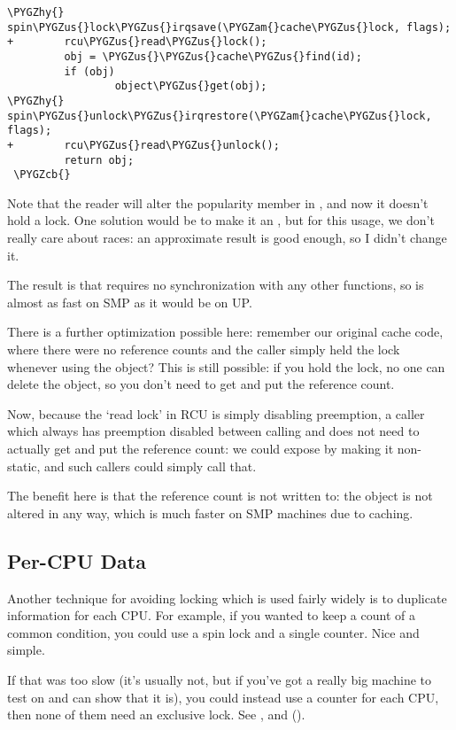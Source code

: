 \documentclass[a4paper,8pt,english]{sphinxmanual}
\def\PYGZus{\char`\_}
\def\PYGZcb{\char`\}}
\def\PYGZam{\char`\&}
\def\PYGZhy{\char`\-}
\begin{document}
\begin{Verbatim}[commandchars=\\\{\}]
\PYGZhy{}        spin\PYGZus{}lock\PYGZus{}irqsave(\PYGZam{}cache\PYGZus{}lock, flags);
+        rcu\PYGZus{}read\PYGZus{}lock();
         obj = \PYGZus{}\PYGZus{}cache\PYGZus{}find(id);
         if (obj)
                 object\PYGZus{}get(obj);
\PYGZhy{}        spin\PYGZus{}unlock\PYGZus{}irqrestore(\PYGZam{}cache\PYGZus{}lock, flags);
+        rcu\PYGZus{}read\PYGZus{}unlock();
         return obj;
 \PYGZcb{}
\end{Verbatim}

Note that the reader will alter the popularity member in
, and now it doesn't hold a lock. One
solution would be to make it an , but for this usage, we
don't really care about races: an approximate result is good enough, so
I didn't change it.

The result is that  requires no
synchronization with any other functions, so is almost as fast on SMP as
it would be on UP.

There is a further optimization possible here: remember our original
cache code, where there were no reference counts and the caller simply
held the lock whenever using the object? This is still possible: if you
hold the lock, no one can delete the object, so you don't need to get
and put the reference count.

Now, because the `read lock' in RCU is simply disabling preemption, a
caller which always has preemption disabled between calling
 and  does not
need to actually get and put the reference count: we could expose
 by making it non-static, and such
callers could simply call that.

The benefit here is that the reference count is not written to: the
object is not altered in any way, which is much faster on SMP machines
due to caching.


\subsection{Per-CPU Data}
\label{kernel-hacking/locking:per-cpu-data}
Another technique for avoiding locking which is used fairly widely is to
duplicate information for each CPU. For example, if you wanted to keep a
count of a common condition, you could use a spin lock and a single
counter. Nice and simple.

If that was too slow (it's usually not, but if you've got a really big
machine to test on and can show that it is), you could instead use a
counter for each CPU, then none of them need an exclusive lock. See
,  and
 ().
\end{document}
